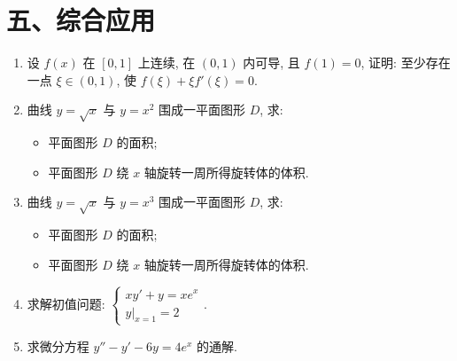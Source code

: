 \section*{五、综合应用}

\begin{enumerate}
    \item 设 $f(x)$ 在 $[0,1]$ 上连续, 在 $(0,1)$ 内可导, 且 $f(1)=0$, 证明: 至少存在一点 $\xi \in(0,1)$, 使 $f(\xi)+\xi f'(\xi)=0$.
    
    \item 曲线 $y=\sqrt{x}$ 与 $y=x^{2}$ 围成一平面图形 $D$, 求:
        \begin{itemize}
            \item 平面图形 $D$ 的面积;
            \item 平面图形 $D$ 绕 $x$ 轴旋转一周所得旋转体的体积.
        \end{itemize}
    
    \item 曲线 $y=\sqrt{x}$ 与 $y=x^{3}$ 围成一平面图形 $D$, 求:
        \begin{itemize}
            \item 平面图形 $D$ 的面积;
            \item 平面图形 $D$ 绕 $x$ 轴旋转一周所得旋转体的体积.
        \end{itemize}
    
    \item 求解初值问题: $\begin{cases} x y'+y=x e^{x} \\ y|_{x=1}=2 \end{cases}$.

    \item 求微分方程 $y''-y'-6y=4 e^{x}$ 的通解.
\end{enumerate}

